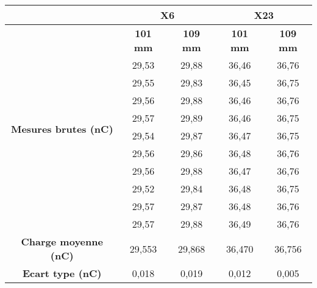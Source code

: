 \documentclass{article}
\begin{document}
\begin{table}[h]
  \centering
  \begin{tabular}{c|cc|cc|}
  \cline{2-5}
                                                           & \multicolumn{2}{c|}{\textbf{X6}} & \multicolumn{2}{c|}{\textbf{X23}} \\ \hline
  \multicolumn{1}{|c|}{\multirow{11}{*}{\textbf{Mesures brutes (nC)}}} & \textbf{101 mm} & \textbf{109 mm} & \textbf{101 mm} & \textbf{109 mm} \\ \cline{2-5} 
  \multicolumn{1}{|c|}{}                                   & 29,53           & 29,88          & 36,46           & 36,76           \\
  \multicolumn{1}{|c|}{}                                   & 29,55           & 29,83          & 36,45           & 36,75           \\
  \multicolumn{1}{|c|}{}                                   & 29,56           & 29,88          & 36,46           & 36,76           \\
  \multicolumn{1}{|c|}{}                                   & 29,57           & 29,89          & 36,46           & 36,75           \\
  \multicolumn{1}{|c|}{}                                   & 29,54           & 29,87          & 36,47           & 36,75           \\
  \multicolumn{1}{|c|}{}                                   & 29,56           & 29,86          & 36,48           & 36,76           \\
  \multicolumn{1}{|c|}{}                                   & 29,56           & 29,88          & 36,47           & 36,76           \\
  \multicolumn{1}{|c|}{}                                   & 29,52           & 29,84          & 36,48           & 36,75           \\
  \multicolumn{1}{|c|}{}                                   & 29,57           & 29,87          & 36,48           & 36,76           \\
  \multicolumn{1}{|c|}{}                                   & 29,57           & 29,88          & 36,49           & 36,76           \\ \hline
  \multicolumn{1}{|c|}{\textbf{Charge moyenne   (nC)}}     & 29,553          & 29,868         & 36,470          & 36,756          \\
  \multicolumn{1}{|c|}{\textbf{Ecart type (nC)}}           & 0,018           & 0,019          & 0,012           & 0,005           \\ \hline

\end{tabular}
\end{table}
\end{document}
